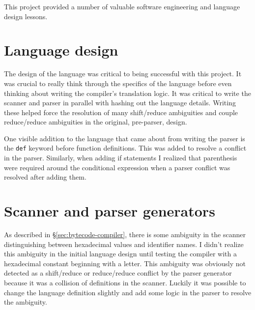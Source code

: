 This project provided a number of valuable software engineering and language design lessons.

\section{Language design}
The design of the language was critical to being successful with this project.  It was crucial to really think through the specifics of the language before even thinking about writing the compiler's translation logic.  It was critical to write the scanner and parser in parallel with hashing out the language details.  Writing these helped force the resolution of many shift/reduce ambiguities and couple reduce/reduce ambiguities in the original, pre-parser, design.

One visible addition to the language that came about from writing the parser is the \texttt{def} keyword before function definitions.  This was added to resolve a conflict in the parser.  Similarly, when adding if statements I realized that parenthesis were required around the conditional expression when a parser conflict was resolved after adding them.

\section{Scanner and parser generators}
As described in \S\ref{sec:bytecode-compiler}, there is some ambiguity in the scanner distinguishing between hexadecimal values and identifier names.  I didn't realize this ambiguity in the initial language design until testing the compiler with a hexadecimal constant beginning with a letter.  This ambiguity was obviously not detected as a shift/reduce or reduce/reduce conflict by the parser generator because it was a collision of definitions in the scanner.  Luckily it was possible to change the language definition slightly and add some logic in the parser to resolve the ambiguity.
